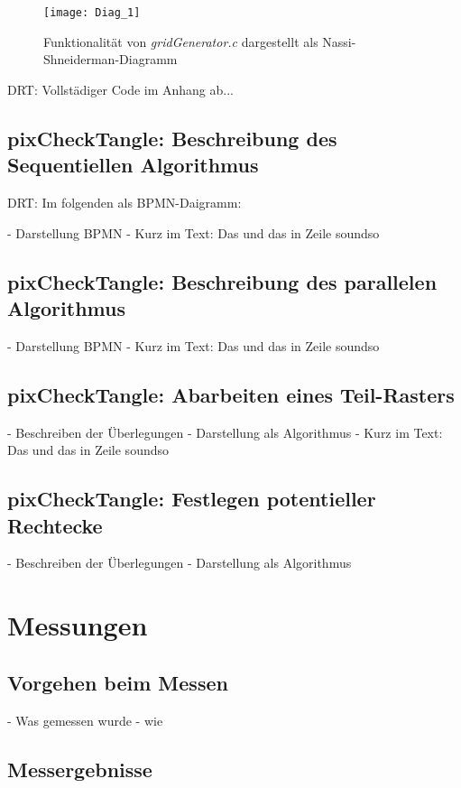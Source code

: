 \documentclass[
10pt, %
a4paper, %
oneside, %
headinclude,footinclude, %
BCOR5mm, %
]{scrartcl}
\begin{document}
\begin{figure}[h]
	\centering 
	\texttt{[image: Diag\_1]} 
	\caption[Funktionalität von \textit{gridGenerator.c} dargestellt als Nassi-Shneiderman-Diagramm]{Funktionalität von \textit{gridGenerator.c} dargestellt als Nassi-Shneiderman-Diagramm}
	\label{fig:gallery} 
\end{figure}

DRT: Vollstädiger Code im Anhang ab...

\subsection{pixCheckTangle: Beschreibung des Sequentiellen Algorithmus}

DRT: Im folgenden als BPMN-Daigramm:



- Darstellung BPMN
- Kurz im Text: Das und das in Zeile soundso

\subsection{pixCheckTangle: Beschreibung des parallelen Algorithmus}

- Darstellung BPMN
- Kurz im Text: Das und das in Zeile soundso

\subsection{pixCheckTangle: Abarbeiten eines Teil-Rasters}

- Beschreiben der Überlegungen
- Darstellung als Algorithmus
- Kurz im Text: Das und das in Zeile soundso

\subsection{pixCheckTangle: Festlegen potentieller Rechtecke}

- Beschreiben der Überlegungen
- Darstellung als Algorithmus

\section{Messungen}
\subsection{Vorgehen beim Messen}
- Was gemessen wurde 
- wie
\subsection{Messergebnisse}
\end{document}

